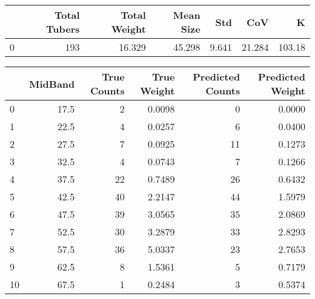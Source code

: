 \begin{tabular}{lrrrrrr}
\toprule
{} &  Total Tubers &  Total Weight &  Mean Size &    Std &     CoV &       K \\
\midrule
0 &           193 &        16.329 &     45.298 &  9.641 &  21.284 &  103.18 \\
\bottomrule
\end{tabular}

\begin{tabular}{lrrrrr}
\toprule
{} &  MidBand &  True Counts &  True Weight &  Predicted Counts &  Predicted Weight \\
\midrule
0  &     17.5 &            2 &       0.0098 &                 0 &            0.0000 \\
1  &     22.5 &            4 &       0.0257 &                 6 &            0.0400 \\
2  &     27.5 &            7 &       0.0925 &                11 &            0.1273 \\
3  &     32.5 &            4 &       0.0743 &                 7 &            0.1266 \\
4  &     37.5 &           22 &       0.7489 &                26 &            0.6432 \\
5  &     42.5 &           40 &       2.2147 &                44 &            1.5979 \\
6  &     47.5 &           39 &       3.0565 &                35 &            2.0869 \\
7  &     52.5 &           30 &       3.2879 &                33 &            2.8293 \\
8  &     57.5 &           36 &       5.0337 &                23 &            2.7653 \\
9  &     62.5 &            8 &       1.5361 &                 5 &            0.7179 \\
10 &     67.5 &            1 &       0.2484 &                 3 &            0.5374 \\
\bottomrule
\end{tabular}

